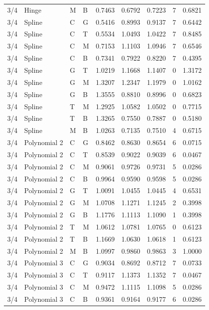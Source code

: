 \begin{longtable}{llllrrrrr}
3/4 & Hinge & M & B & 0.7463 & 0.6792 & 0.7223 & 7 & 0.6821 \\
3/4 & Spline & C & G & 0.5416 & 0.8993 & 0.9137 & 7 & 0.6442 \\
3/4 & Spline & C & T & 0.5534 & 1.0493 & 1.0422 & 7 & 0.8485 \\
3/4 & Spline & C & M & 0.7153 & 1.1103 & 1.0946 & 7 & 0.6546 \\
3/4 & Spline & C & B & 0.7341 & 0.7922 & 0.8220 & 7 & 0.4395 \\
3/4 & Spline & G & T & 1.0219 & 1.1668 & 1.1407 & 0 & 1.3172 \\
3/4 & Spline & G & M & 1.3207 & 1.2347 & 1.1979 & 0 & 1.0162 \\
3/4 & Spline & G & B & 1.3555 & 0.8810 & 0.8996 & 0 & 0.6823 \\
3/4 & Spline & T & M & 1.2925 & 1.0582 & 1.0502 & 0 & 0.7715 \\
3/4 & Spline & T & B & 1.3265 & 0.7550 & 0.7887 & 0 & 0.5180 \\
3/4 & Spline & M & B & 1.0263 & 0.7135 & 0.7510 & 4 & 0.6715 \\
3/4 & Polynomial 2 & C & G & 0.8462 & 0.8630 & 0.8654 & 6 & 0.0715 \\
3/4 & Polynomial 2 & C & T & 0.8539 & 0.9022 & 0.9039 & 6 & 0.0467 \\
3/4 & Polynomial 2 & C & M & 0.9061 & 0.9726 & 0.9731 & 5 & 0.0286 \\
3/4 & Polynomial 2 & C & B & 0.9964 & 0.9590 & 0.9598 & 5 & 0.0286 \\
3/4 & Polynomial 2 & G & T & 1.0091 & 1.0455 & 1.0445 & 4 & 0.6531 \\
3/4 & Polynomial 2 & G & M & 1.0708 & 1.1271 & 1.1245 & 2 & 0.3998 \\
3/4 & Polynomial 2 & G & B & 1.1776 & 1.1113 & 1.1090 & 1 & 0.3998 \\
3/4 & Polynomial 2 & T & M & 1.0612 & 1.0781 & 1.0765 & 0 & 0.6123 \\
3/4 & Polynomial 2 & T & B & 1.1669 & 1.0630 & 1.0618 & 1 & 0.6123 \\
3/4 & Polynomial 2 & M & B & 1.0997 & 0.9860 & 0.9863 & 3 & 1.0000 \\
3/4 & Polynomial 3 & C & G & 0.9034 & 0.8692 & 0.8712 & 7 & 0.0733 \\
3/4 & Polynomial 3 & C & T & 0.9117 & 1.1373 & 1.1352 & 7 & 0.0467 \\
3/4 & Polynomial 3 & C & M & 0.9472 & 1.1115 & 1.1098 & 5 & 0.0286 \\
3/4 & Polynomial 3 & C & B & 0.9361 & 0.9164 & 0.9177 & 6 & 0.0286 \\

\end{longtable}
